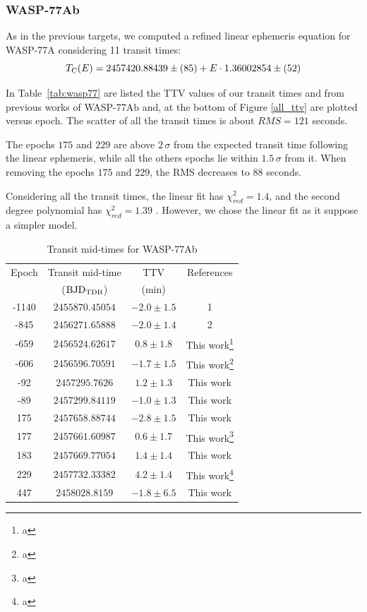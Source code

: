 \subsubsection{WASP-77Ab}

As in the previous targets, we computed a refined linear ephemeris equation for WASP-77A considering 11 transit times:
\begin{equation} \label{eq1_w77}
T_{\rm C}(E)=2457420.88439\pm(85)+E \cdot 1.36002854\pm(52)
\end{equation}

In Table~\ref{tab:wasp77} are listed the TTV values of our transit times and from previous works \citep{Turner2016,Maxted2013} of WASP-77Ab and, at the bottom of Figure \ref{all_ttv} are plotted versus epoch. The scatter of all the transit times is about $RMS=121$ seconds. 

The epochs $175$ and $229$ are above $2\,\sigma$ from the expected transit time following the linear ephemeris, while all the others epochs lie within $1.5\,\sigma$ from it. When removing the epochs $175$ and $229$, the RMS decreases to 88 seconds. 

Considering all the transit times, the linear fit has $\chi^{2}_{red}=1.4$, and the second degree polynomial has $\chi^{2}_{red}=1.39$ . However, we chose the linear fit as it suppose a simpler model.

\begin{table}
\caption{Transit mid-times for WASP-77Ab}
\label{times_wasp77}
\centering
\begin{tabular}{cccc}
\hline \hline
Epoch & Transit mid-time & TTV & References\\
      & (${\rm BJD_{TDB}}$) & (min) &  \\
\hline
-1140 & $2455870.45054$ & $-2.0\pm1.5$ & 1 \\
-845 & $2456271.65888$ & $-2.0\pm1.4$ & 2 \\
-659 & $2456524.62617$ & $0.8\pm1.8$ & This work\footnote{a} \\
-606 & $2456596.70591$ & $-1.7\pm1.5$  & This work\footnote{a}  \\
-92 & $2457295.7626$  & $1.2\pm1.3$& This work \\
-89 & $2457299.84119$ &  $-1.0\pm1.3$ & This work \\
175 & $2457658.88744$ & $-2.8\pm1.5$ & This work\\
177 & $2457661.60987$   & $0.6\pm1.7$ & This work\footnote{a} \\
183 & $2457669.77054$ &  $1.4\pm1.4$  & This work  \\
229 & $2457732.33382$ & $4.2\pm1.4$& This work\footnote{a} \\
447 & $2458028.8159$  & $-1.8\pm6.5$ & This work\\ 
\hline
\end{tabular}
\end{table}


